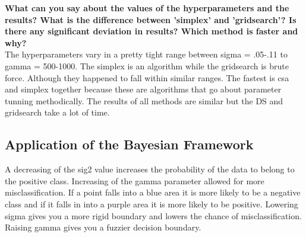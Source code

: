 \documentclass[11pt,oneside,a4paper]{article}
\begin{document}
\textbf{
What can you say about the values of the hyperparameters
and the results? What is the difference between 'simplex' and 'gridsearch'? Is there any significant deviation in results?
Which method is faster and why?}\\

The hyperparameters vary in a pretty tight range between sigma = .05-.11 to gamma = 500-1000. The simplex is an algorithm while the gridsearch is brute force. Although they happened to fall within similar ranges. The fastest is csa and simplex together because these are algorithms that go about parameter tunning methodically. The results of all methods are similar but the DS and gridsearch take a lot of time. 

\subsection{Application of the Bayesian Framework}
A decreasing of the sig2 value increases the probability of the data to belong to the positive class. Increasing of the gamma parameter allowed for more misclassification. If a point falls into a blue area it is more likely to be a negative class and if it falls in into a purple area it is more likely to be positive. Lowering sigma gives you a more rigid boundary and lowers the chance of misclassification. Raising gamma gives you a fuzzier decision boundary.
\end{document}
